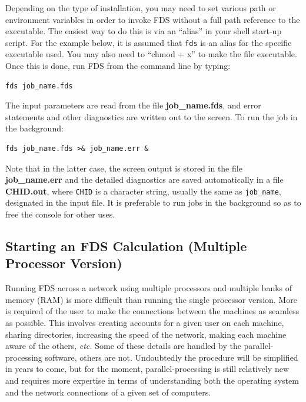 \documentclass[11pt]{book}
\newcommand{\ct}{\tt\small}
\begin{document}
Depending on the type of installation, you may need to set various
path or environment variables in order to invoke FDS without a full
path reference to the executable. The easiest way to do this is via
an ``alias'' in your shell start-up script. For the example below,
it is assumed that {\ct fds} is an alias for the specific executable used.
You may also need to ``chmod + x'' to make the file executable.
Once this is done, run FDS from the command line by typing:
\begin{verbatim}
fds job_name.fds
\end{verbatim}
The input parameters are read from the file {\bf job\_name.fds},
and error statements and other diagnostics are written out to the screen.
To run the job in the background:
\begin{verbatim}
fds job_name.fds >& job_name.err &
\end{verbatim}
Note that in the latter case, the screen output is stored in the file
{\bf job\_name.err} and the detailed diagnostics are saved automatically
in a file {\bf CHID.out}, where {\ct CHID} is a character string, usually
the same as {\ct job\_name}, designated in the input file. It is preferable
to run jobs in the background so as to free the console for other uses.



\subsection{Starting an FDS Calculation (Multiple Processor Version)}
\label{info:parallelprocessing}

Running FDS across a network using multiple processors and multiple
banks of memory (RAM) is more difficult than running the single
processor version.  More is required of the user to make the
connections between the machines as seamless as possible. This
involves creating accounts for a given user on each machine, sharing
directories, increasing the speed of the network, making each machine
aware of the others, {\em etc.}  Some of these details are handled by
the parallel-processing software, others are not. Undoubtedly the
procedure will be simplified in years to come, but for the moment,
parallel-processing is still relatively new and requires more
expertise in terms of understanding both the operating system and the
network connections of a given set of computers.
\end{document}
